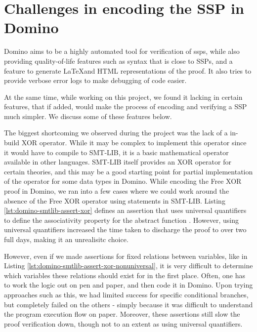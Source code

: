\section{Challenges in encoding the SSP in Domino}
\label{sec:challengesandlimitations}
Domino aims to be a highly automated tool for verification of \acrlong{ssp}s, while also providing quality-of-life features such as syntax that is close to SSPs, and a feature to generate \LaTeX and HTML representations of the proof. It also tries to provide verbose error logs to make debugging of code easier. 

At the same time, while working on this project, we found it lacking in certain features, that if added, would make the process of encoding and verifying a SSP much simpler. We discuss some of these features below.

The biggest shortcoming we observed during the project was the lack of a in-build XOR operator. While it may be complex to implement this operator since it would have to compile to SMT-LIB, it is a basic mathematical operator available in other languages. SMT-LIB itself provides an XOR operator for certain theories, and this may be a good starting point for partial implementation of the operator for some data types in Domino. While encoding the Free XOR proof in Domino, we ran into a few cases where we could work around the absence of the Free XOR operator using  statements in SMT-LIB. Listing \ref{lst:domino-smtlib-assert-xor} defines an assertion that uses universal quantifiers to define the associativity property for the abstract function . However, using universal quantifiers increased the time taken to discharge the proof to over two full days, making it an unrealisitc choice.



However, even if we made assertions for fixed relations between variables, like in Listing \ref{lst:domino-smtlib-assert-xor-nonuniversal}, it is very difficult to determine which variables these relations should exist for in the first place. Often, one has to work the logic out on pen and paper, and then code it in Domino. Upon trying approaches such as this, we had limited success for specific conditional branches, but completely failed on the others - simply because it was difficult to understand the program execution flow on paper. Moreover, these assertions still slow the proof verification down, though not to an extent as using universal quantifiers.

